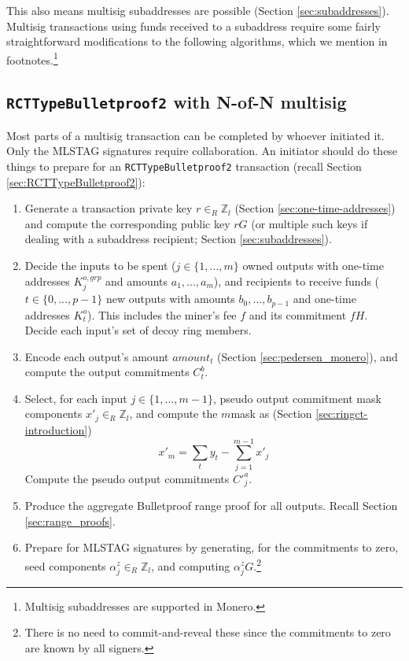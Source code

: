 This also means multisig subaddresses are possible (Section \ref{sec:subaddresses}). Multisig transactions using funds received to a subaddress require some fairly straightforward modifications to the following algorithms, which we mention in footnotes.\footnote{Multisig subaddresses are supported in Monero.}


\subsection{{\tt RCTTypeBulletproof2} with N-of-N multisig}
\label{sec:rcttypebulletproof2-multisig}

Most parts of a multisig transaction can be completed by whoever initiated it. Only the MLSTAG signatures require collaboration. An initiator should do these things to prepare for an {\tt RCTTypeBulletproof2} transaction (recall Section \ref{sec:RCTTypeBulletproof2}):
\begin{enumerate}
    \item Generate a transaction private key $r \in_R \mathbb{Z}_l$ (Section \ref{sec:one-time-addresses}) and compute the corresponding public key $r G$ (or multiple such keys if dealing with a subaddress recipient; Section \ref{sec:subaddresses}).
    \item Decide the inputs to be spent ($j \in \{1,...,m\}$ owned outputs with one-time addresses $K^{o,grp}_j$ and amounts $a_1,...,a_m$), and recipients to receive funds ($t \in \{0,...,p-1\}$ new outputs with amounts $b_0,...,b_{p-1}$ and one-time addresses $K^{o}_t$). This includes the miner's fee $f$ and its commitment $f H$. Decide each input's set of decoy ring members.
    \item Encode each output's amount $\mathit{amount}_t$ (Section \ref{sec:pedersen_monero}), and compute the output commitments $C^b_t$.
    \item Select, for each input $j \in \{1,...,m-1\}$, pseudo output commitment mask components $x'_{j} \in_R \mathbb{Z}_l$, and compute the $m$\nth mask as (Section \ref{sec:ringct-introduction})
    \[x'_m = \sum_t y_t - \sum_{j=1}^{m-1} x'_j\]
    Compute the pseudo output commitments $C'^a_{j}$.
    \item Produce the aggregate Bulletproof range proof for all outputs. Recall Section \ref{sec:range_proofs}.
    \item Prepare for MLSTAG signatures by generating, for the commitments to zero, seed components $\alpha^z_{j} \in_R \mathbb{Z}_l$, and computing $\alpha^z_{j} G$.\footnote{There is no need to commit-and-reveal these since the commitments to zero are known by all signers.}
\end{enumerate}

